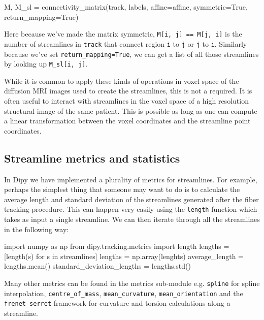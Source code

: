 \documentclass{bioinfo}
\begin{document}
\begin{python}
M, M_sl = connectivity_matrix(track, labels,
                              affine=affine,
                              symmetric=True,
                              return_mapping=True)
\end{python}

Here because we've made the matrix symmetric, \texttt{M[i, j] == M[j, i]} is the number
of streamlines in \texttt{track} that connect region \texttt{i} to \texttt{j}
or \texttt{j} to \texttt{i}. Similarly because we've set
\texttt{return\_mapping=True}, we can get a list of all those streamlines by
looking up \texttt{M\_sl[i, j]}.

While it is common to apply these kinds of operations in voxel space of
the diffusion MRI images used to create the streamlines, this is not a
required. It is often useful to interact with streamlines in the voxel space of
a high resolution structural image of the same patient. This is possible as
long as one can compute a linear transformation between the voxel coordinates and
the streamline point coordinates.

\subsection{Streamline metrics and statistics}

In Dipy we have implemented a plurality of metrics for streamlines. For example,
perhaps the simplest thing that someone may want to do is to calculate the
average length and standard deviation of the streamlines generated after the
fiber tracking procedure. This can happen very easily using the \texttt{length}
function which takes as input a single streamline. We can then iterate through
all the streamlines in the following way:
\begin{python}
import numpy as np
from dipy.tracking.metrics import length
lengths = [length(s) for s in streamlines]
lengths = np.array(lenghts)
average_length = lengths.mean()
standard_deviation_lengths = lengths.std()
\end{python}
Many other metrics can be found in the metrics sub-module e.g. \texttt{spline} for
spline interpolation, \texttt{centre\_of\_mass}, \texttt{mean\_curvature},
\texttt{mean\_orientation} and the \texttt{frenet serret} framework for curvature
and torsion calculations along a streamline.
\end{document}
